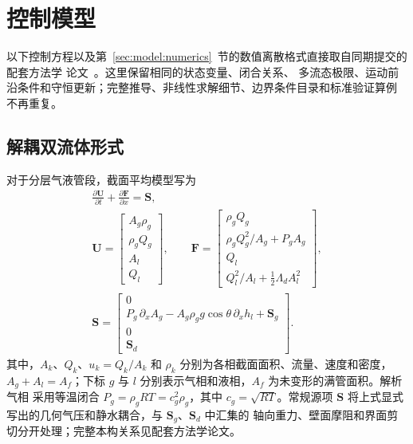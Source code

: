\section{控制模型}
\label{sec:model}

以下控制方程以及第~\ref{sec:model:numerics}~节的数值离散格式直接取自同期提交的配套方法学
论文~\cite{xue2026model}。这里保留相同的状态变量、闭合关系、
多流态极限、运动前沿条件和守恒更新；完整推导、非线性求解细节、边界条件目录和标准验证算例
不再重复。

\subsection{解耦双流体形式}
\label{sec:model:framework}

对于分层气液管段，截面平均模型写为
\begin{equation}
\begin{gathered}
\frac{\partial\mathbf U}{\partial t}
+\frac{\partial\mathbf F}{\partial x}=\mathbf S,\\[2pt]
\mathbf U=
\begin{bmatrix}
A_g\rho_g\\ \rho_gQ_g\\ A_l\\ Q_l
\end{bmatrix},
\qquad
\mathbf F=
\begin{bmatrix}
\rho_gQ_g\\
\rho_gQ_g^2/A_g+P_gA_g\\
Q_l\\
Q_l^2/A_l+\tfrac12\Lambda_dA_l^2
\end{bmatrix},\\[3pt]
\mathbf S=
\begin{bmatrix}
0\\
P_g\,\partial_xA_g-A_g\rho_g g\cos\theta\,\partial_xh_l+\mathbf S_g\\
0\\
\mathbf S_d
\end{bmatrix}.
\end{gathered}
\label{eq:system}
\end{equation}
其中，$A_k$、$Q_k$、$u_k=Q_k/A_k$ 和 $\rho_k$ 分别为各相截面面积、流量、速度和密度，
$A_g+A_l=A_f$；下标 $g$ 与 $l$ 分别表示气相和液相，$A_f$ 为未变形的满管面积。解析气相
采用等温闭合 $P_g=\rho_gRT=c_g^2\rho_g$，其中 $c_g=\sqrt{RT}$。常规源项
$\mathbf S$ 将上式显式写出的几何气压和静水耦合，与 $\mathbf S_g$、$\mathbf S_d$ 中汇集的
轴向重力、壁面摩阻和界面剪切分开处理；完整本构关系见配套方法学论文。

